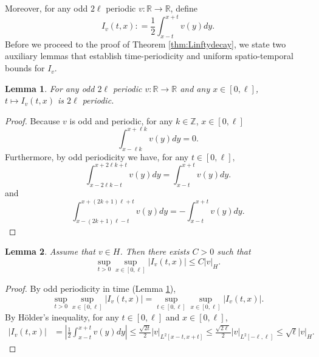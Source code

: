 \documentclass[10pt, reqno]{amsart}
\newtheorem{lem}{Lemma}
\theoremstyle{definition}
\numberwithin{lem}{section}
\numberwithin{cor}{section}
\numberwithin{prop}{section}
\numberwithin{thm}{section}
\numberwithin{dfn}{section}
\begin{document}
Moreover, for any odd $2\ell$ periodic $v: \mathbb{R} \to \mathbb{R}$, define \begin{equation}\label{eq:Iv_definition}
    I_v(t,x): = \frac{1}{2}\int_{x-t}^{x+t} v(y)dy.
\end{equation}
Before we proceed to the proof of Theorem \ref{thm:Linftydecay}, we state two auxiliary lemmas that establish time-periodicity and uniform spatio-temporal bounds for $I_v.$ 

\begin{lem} \label{lem:I-periodic}
	For any odd $2\ell$ periodic $v: \mathbb{R} \to \mathbb{R}$ and any $x \in [0,\ell]$, $t \mapsto I_v(t,x)$ is $2\ell$ periodic.
\end{lem}
\begin{proof}
	Because $v$ is odd and periodic, for any $k \in \mathbb{Z}$, $x \in [0,\ell]$
	\begin{equation*}
		\int_{x-\ell k}^{x + \ell k} v(y)dy = 0.
	\end{equation*}
	Furthermore, by odd periodicity we have, for any $t \in [0,\ell],$
	\begin{equation*}
		\int_{x-2\ell k -t}^{x + 2\ell k + t} v(y)dy = \int_{x - t}^{x + t }v(y)dy.
	\end{equation*}
	and
	\begin{equation*}
		\int_{x-(2k + 1)\ell  -t}^{x + (2k+1)\ell  + t} v(y)dy = -\int_{x - t}^{x + t }v(y)dy.
	\end{equation*}
\end{proof}




 

\begin{lem} \label{lem:integral-bound}
	Assume that $v \in H$. Then there exists $C>0$ such that
	\begin{equation*}
		\sup_{t>0} \sup_{x \in [0,\ell]  } |I_v(t,x)| \leq C|v|_{H}.
	\end{equation*}
\end{lem}
\begin{proof}
	By odd periodicity in time (Lemma \ref{lem:I-periodic}),
	\begin{equation*}
		\sup_{t>0} \sup_{x \in [0,\ell]}|I_v(t,x)| = \sup_{t \in [0,\ell]} \sup_{x \in [0,\ell]} |I_v(t,x)|.
	\end{equation*}
	By H\"older's inequality, for any $t \in [0,\ell]$ and $x \in [0,\ell]$,
	\begin{align}
		|I_v(t,x)| &= \left|\frac{1}{2}\int_{x - t}^{x + t} v(y)dy \right|\nonumber \leq \frac{\sqrt{ 2t}}{2} |v|_{L^2[x-t,x+t]} \nonumber\leq \frac{\sqrt{2\ell}}{2} |v|_{L^2[-\ell,\ell]} \nonumber \leq \sqrt{\ell} |v|_{H} .\end{align}
\end{proof}
\end{document}
